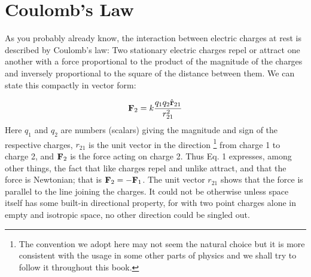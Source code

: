 \section{Coulomb's Law}

 As you probably already know, the interaction
between electric charges at rest is described by Coulomb's law: Two
stationary electric charges repel or attract one another with a force
proportional to the product of the magnitude of the charges and
inversely proportional to the square of the distance between them. We
can state this compactly in vector form: 

\begin{equation}
  \mathbf{F}_2=k\frac{q_1q_2\hat{\mathbf{r}}_{21}}{r_{21}^2}
\end{equation}
\noindent Here
$q_1$ and $q_2$ are numbers (scalars) giving the magnitude and sign
of the respective charges, $r_{21}$ is the unit vector in the direction
\footnote{The convention we adopt here may not seem the natural
choice but it is more consistent with the usage in some other parts
of physics and we shall try to follow it throughout this book.} from
charge 1 to charge 2, and $\mathbf{F}_2$ is the force acting on charge 2. Thus
Eq. 1 expresses, among other things, the fact that like charges repel
and unlike attract, and that the force is Newtonian; that is
$\mathbf{F}_2=-\mathbf{F}_1$. The unit vector $r_{21}$ shows that the force is parallel
to the line joining the charges. It could not be otherwise unless
space itself has some built-in directional property, for with two
point charges alone in empty and isotropic space, no other direction
could be singled out.

